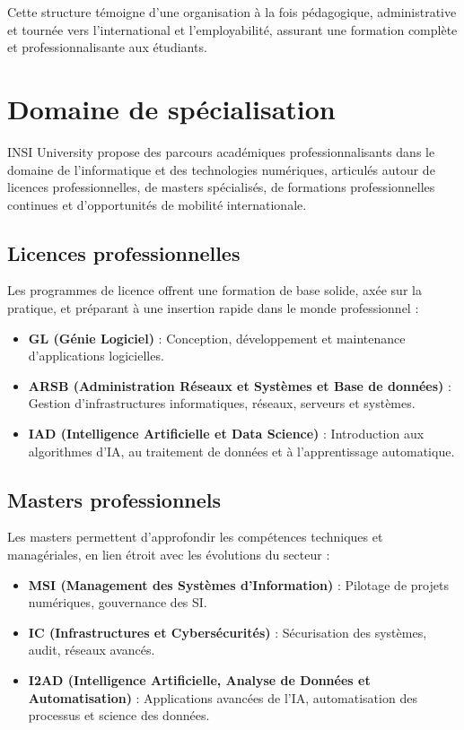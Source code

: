 \documentclass[a4paper,12pt]{article}
\begin{document}
Cette structure témoigne d’une organisation à la fois pédagogique, administrative et tournée vers l’international et l’employabilité, assurant une formation complète et professionnalisante aux étudiants.
\section{Domaine de spécialisation}

INSI University propose des parcours académiques professionnalisants dans le domaine de l’informatique et des technologies numériques, articulés autour de licences professionnelles, de masters spécialisés, de formations professionnelles continues et d’opportunités de mobilité internationale.

\subsection{Licences professionnelles}

Les programmes de licence offrent une formation de base solide, axée sur la pratique, et préparant à une insertion rapide dans le monde professionnel :

\begin{itemize}
    \item \textbf{GL (Génie Logiciel)} : Conception, développement et maintenance d'applications logicielles.
    \item \textbf{ARSB (Administration Réseaux et Systèmes et Base de données)} : Gestion d’infrastructures informatiques, réseaux, serveurs et systèmes.
    \item \textbf{IAD (Intelligence Artificielle et Data Science)} : Introduction aux algorithmes d’IA, au traitement de données et à l’apprentissage automatique.
\end{itemize}

\subsection{Masters professionnels}

Les masters permettent d’approfondir les compétences techniques et managériales, en lien étroit avec les évolutions du secteur :

\begin{itemize}
    \item \textbf{MSI (Management des Systèmes d’Information)} : Pilotage de projets numériques, gouvernance des SI.
    \item \textbf{IC (Infrastructures et Cybersécurités)} : Sécurisation des systèmes, audit, réseaux avancés.
    \item \textbf{I2AD (Intelligence Artificielle, Analyse de Données et Automatisation)} : Applications avancées de l’IA, automatisation des processus et science des données.
\end{itemize}
\end{document}
